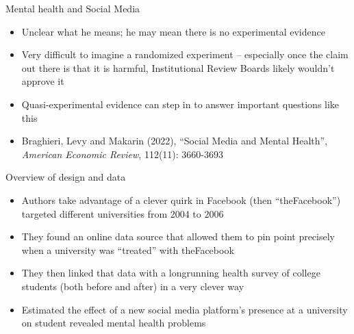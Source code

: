 \documentclass{beamer}
\begin{document}
\begin{frame}{Mental health and Social Media}

\begin{itemize}
\item Unclear what he means; he may mean there is no experimental evidence
\item Very difficult to imagine a randomized experiment -- especially once the claim out there is that it is harmful, Institutional Review Boards likely wouldn't approve it
\item Quasi-experimental evidence can step in to answer important questions like this
\item Braghieri, Levy and Makarin (2022), ``Social Media and Mental Health'', \emph{American Economic Review}, 112(11): 3660-3693


\end{itemize}

\end{frame}

\begin{frame}{Overview of design and data}

\begin{itemize}
\item Authors take advantage of a clever quirk in Facebook (then ``theFacebook'') targeted different universities from 2004 to 2006
\item They found an online data source that allowed them to pin point precisely when a university was ``treated'' with theFacebook
\item They then linked that data with a longrunning health survey of college students (both before and after) in a very clever way
\item Estimated the effect of a new social media platform's presence at a university on student revealed mental health problems

\end{itemize}

\end{frame}
\end{document}
